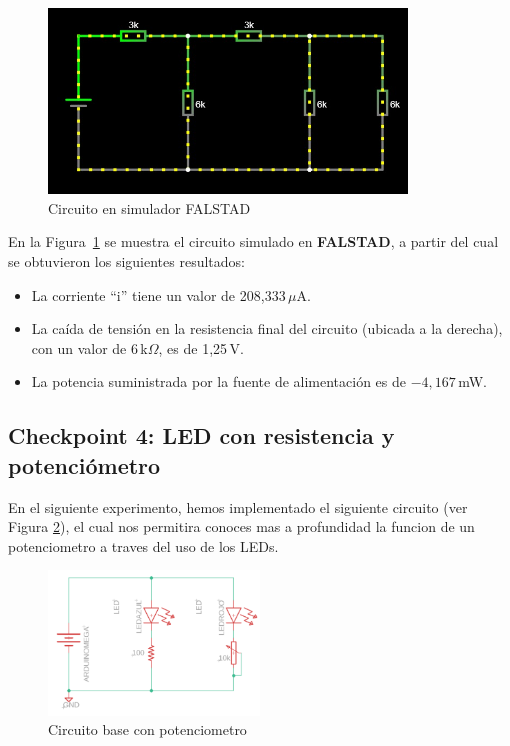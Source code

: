 \documentclass{article}
\begin{document}
\begin{figure}[H]
    \centering
    \includegraphics[width=0.85\textwidth]{./img/Falstad.jpeg}
    \caption{Circuito en simulador FALSTAD}
    \label{fig:circuito_falstad}
\end{figure}

En la Figura~\ref{fig:circuito_falstad} se muestra el circuito simulado en \textbf{FALSTAD}, a partir del cual se obtuvieron los siguientes resultados:

\begin{itemize}
    \item La corriente ``i'' tiene un valor de 208{,}333\,$\mu$A.
    \item La caída de tensión en la resistencia final del circuito (ubicada a la derecha), con un valor de 6\,k$\Omega$, es de 1{,}25\,V.
    \item La potencia suministrada por la fuente de alimentación es de $-4{,}167$\,mW.
\end{itemize}

\subsection{Checkpoint 4: LED con resistencia y potenciómetro}
En el siguiente experimento, hemos implementado el siguiente circuito (ver Figura \ref{fig:circuito_chkp_4}), el cual nos permitira conoces mas a profundidad la funcion de un potenciometro a traves del uso de los LEDs.

\begin{figure}[H]
    \centering
    \includegraphics[width=0.50\textwidth]{./img/Circuito-potenciometro.png}
    \caption{Circuito base con potenciometro}
    \label{fig:circuito_chkp_4}
\end{figure}
\end{document}
